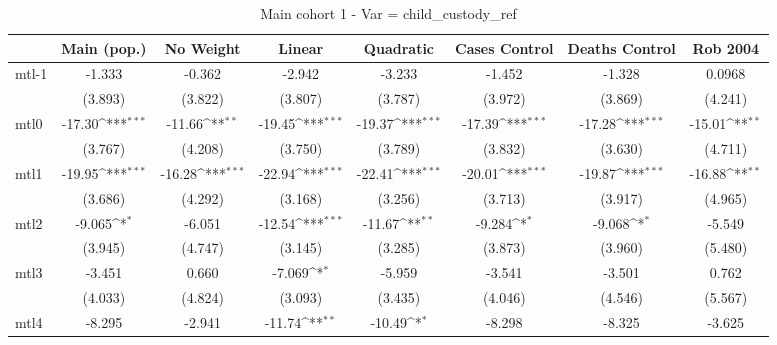 \documentclass{article}
\begin{document}
{
\def\sym#1{\ifmmode^{#1}\else\(^{#1}\)\fi}
\begin{longtable}{l*{7}{c}}
\caption{Main cohort 1 - Var = child\_custody\_ref}\\
\hline\hline\endfirsthead\hline\endhead\hline\endfoot\endlastfoot
                &\multicolumn{1}{c}{Main (pop.)}&\multicolumn{1}{c}{No Weight}&\multicolumn{1}{c}{Linear}&\multicolumn{1}{c}{Quadratic}&\multicolumn{1}{c}{Cases Control}&\multicolumn{1}{c}{Deaths Control}&\multicolumn{1}{c}{Rob 2004}\\
\hline
mtl-1           &   -1.333         &   -0.362         &   -2.942         &   -3.233         &   -1.452         &   -1.328         &   0.0968         \\
                &  (3.893)         &  (3.822)         &  (3.807)         &  (3.787)         &  (3.972)         &  (3.869)         &  (4.241)         \\
mtl0            &   -17.30\sym{***}&   -11.66\sym{**} &   -19.45\sym{***}&   -19.37\sym{***}&   -17.39\sym{***}&   -17.28\sym{***}&   -15.01\sym{**} \\
                &  (3.767)         &  (4.208)         &  (3.750)         &  (3.789)         &  (3.832)         &  (3.630)         &  (4.711)         \\
mtl1            &   -19.95\sym{***}&   -16.28\sym{***}&   -22.94\sym{***}&   -22.41\sym{***}&   -20.01\sym{***}&   -19.87\sym{***}&   -16.88\sym{**} \\
                &  (3.686)         &  (4.292)         &  (3.168)         &  (3.256)         &  (3.713)         &  (3.917)         &  (4.965)         \\
mtl2            &   -9.065\sym{*}  &   -6.051         &   -12.54\sym{***}&   -11.67\sym{**} &   -9.284\sym{*}  &   -9.068\sym{*}  &   -5.549         \\
                &  (3.945)         &  (4.747)         &  (3.145)         &  (3.285)         &  (3.873)         &  (3.960)         &  (5.480)         \\
mtl3            &   -3.451         &    0.660         &   -7.069\sym{*}  &   -5.959         &   -3.541         &   -3.501         &    0.762         \\
                &  (4.033)         &  (4.824)         &  (3.093)         &  (3.435)         &  (4.046)         &  (4.546)         &  (5.567)         \\
mtl4            &   -8.295         &   -2.941         &   -11.74\sym{**} &   -10.49\sym{*}  &   -8.298         &   -8.325         &   -3.625         \\

\end{longtable}}
\end{document}
